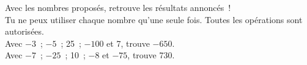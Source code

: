\begin{enigme}

Avec les nombres proposés, retrouve les résultats annoncés ! \\[0.5em]
Tu ne peux utiliser chaque nombre qu'une seule fois. Toutes les opérations sont autorisées.\\[0.5em]
Avec $- 3$ ; $- 5$ ; 25 ; $- 100$ et 7, trouve $- 650$.\\[0.5em]
Avec $- 7$ ; $- 25$ ; 10 ; $- 8$ et $- 75$, trouve 730.

\end{enigme} 
